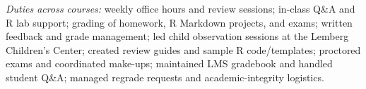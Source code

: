 \documentclass[10pt, letterpaper]{article}
\begin{document}
\textit{Duties across courses:} weekly office hours and review sessions; in-class Q\&A and R lab support; grading of homework, R Markdown projects, and exams; written feedback and grade management; led child observation sessions at the Lemberg Children’s Center; created review guides and sample R code/templates; proctored exams and coordinated make-ups; maintained LMS gradebook and handled student Q\&A; managed regrade requests and academic-integrity logistics.
\end{document}
